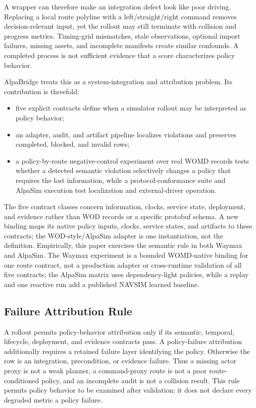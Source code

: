 \documentclass[a4paper,10pt,conference]{ieeeconf}
\begin{document}
A wrapper can therefore make an integration defect look like poor driving. Replacing a
local route polyline with a left/straight/right command removes decision-relevant input,
yet the rollout may still terminate with collision and progress metrics. Timing-grid
mismatches, stale observations, optional import failures, missing assets, and incomplete
manifests create similar confounds. A completed process is not sufficient evidence that
a score characterizes policy behavior.

AlpaBridge treats this as a system-integration and attribution problem. Its contribution is
threefold:
\begin{itemize}
  \item five explicit contracts define when a simulator rollout may be interpreted as
  policy behavior;
  \item an adapter, audit, and artifact pipeline localizes violations and preserves
  completed, blocked, and invalid rows;
  \item a policy-by-route negative-control experiment over real WOMD records tests
  whether a detected semantic violation selectively changes a policy that requires the
  lost information, while a protocol-conformance suite and AlpaSim execution test
  localization and external-driver operation.
\end{itemize}
The five contract classes concern information, clocks, service state, deployment, and
evidence rather than WOD records or a specific protobuf schema. A new binding maps its
native policy inputs, clocks, service states, and artifacts to these contracts; the
WOD-style/AlpaSim adapter is one instantiation, not the definition. Empirically, this
paper exercises the semantic rule in both Waymax and AlpaSim. The Waymax experiment is
a bounded WOMD-native binding for one route contract, not a production adapter or
cross-runtime validation of all five contracts; the AlpaSim matrix uses
dependency-light policies, while a replay and one reactive run add a published NAVSIM
learned baseline.

\subsection{Failure Attribution Rule}

A rollout permits policy-behavior attribution only if its semantic, temporal,
lifecycle, deployment, and evidence contracts pass. A policy-failure attribution
additionally requires a retained failure layer identifying the policy. Otherwise the
row is an integration, precondition, or evidence failure. Thus a missing actor proxy is
not a weak planner, a command-proxy route is not a poor route-conditioned policy, and an
incomplete audit is not a collision result. This rule permits policy behavior to be
examined after validation; it does not declare every degraded metric a policy failure.
\end{document}
